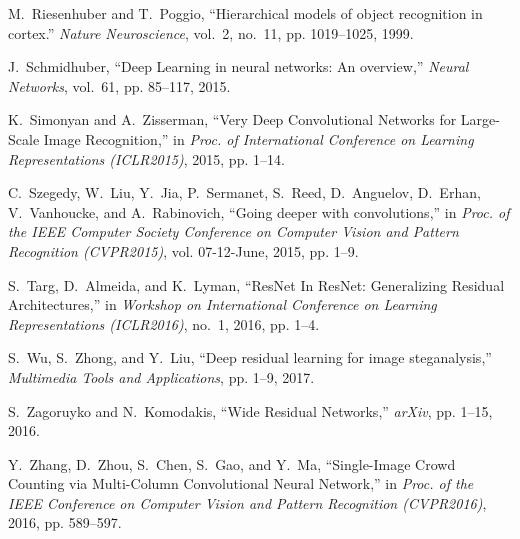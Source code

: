 \documentclass[journal]{IEEEtran}
\begin{document}
\begin{thebibliography}{10}
M.~Riesenhuber and T.~Poggio, ``{Hierarchical models of object recognition in
  cortex.}'' \emph{Nature Neuroscience}, vol.~2, no.~11, pp. 1019--1025, 1999.

J.~Schmidhuber, ``{Deep Learning in neural networks: An overview},''
  \emph{Neural Networks}, vol.~61, pp. 85--117, 2015.

K.~Simonyan and A.~Zisserman, ``{Very Deep Convolutional Networks for
  Large-Scale Image Recognition},'' in \emph{Proc. of International Conference
  on Learning Representations (ICLR2015)}, 2015, pp. 1--14.

C.~Szegedy, W.~Liu, Y.~Jia, P.~Sermanet, S.~Reed, D.~Anguelov, D.~Erhan,
  V.~Vanhoucke, and A.~Rabinovich, ``{Going deeper with convolutions},'' in
  \emph{Proc. of the IEEE Computer Society Conference on Computer Vision and
  Pattern Recognition (CVPR2015)}, vol. 07-12-June, 2015, pp. 1--9.

S.~Targ, D.~Almeida, and K.~Lyman, ``{ResNet In ResNet: Generalizing Residual
  Architectures},'' in \emph{Workshop on International Conference on Learning
  Representations (ICLR2016)}, no.~1, 2016, pp. 1--4.

S.~Wu, S.~Zhong, and Y.~Liu, ``{Deep residual learning for image
  steganalysis},'' \emph{Multimedia Tools and Applications}, pp. 1--9, 2017.

S.~Zagoruyko and N.~Komodakis, ``{Wide Residual Networks},'' \emph{arXiv}, pp.
  1--15, 2016.

Y.~Zhang, D.~Zhou, S.~Chen, S.~Gao, and Y.~Ma, ``{Single-Image Crowd Counting
  via Multi-Column Convolutional Neural Network},'' in \emph{Proc. of the IEEE
  Conference on Computer Vision and Pattern Recognition (CVPR2016)}, 2016, pp.
  589--597.

\end{thebibliography}





\end{document}
